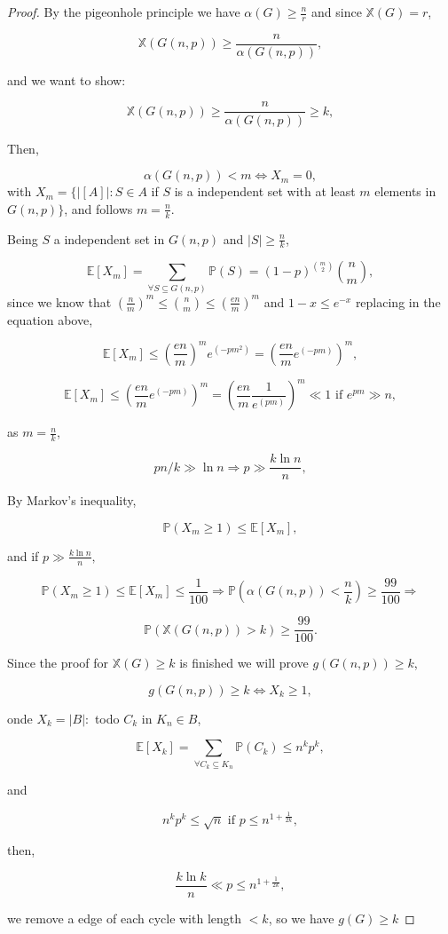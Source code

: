 \documentclass[12pt,twoside,a4paper]{book}
\numberwithin{equation}{section}
\let\subset\subseteq
\let\log=\ln
\theoremstyle{remark}
\begin{document}
\begin{proof}
By the pigeonhole principle we have $\alpha (G) \geq \frac{n}{r}$ and since $\mathbb{X}(G)=r$,

$$\mathbb{X}(G(n,p)) \geq \frac{n}{\alpha(G(n,p))},$$

and we want to show:

$$\mathbb{X}(G(n,p)) \geq \frac{n}{\alpha(G(n,p))} \geq k ,$$

Then,

$$\alpha(G(n,p)) < m \iff X_m=0 ,$$
with $X_m = \{|[A]|: S \in A$ if $S$ is a independent set with at least $m$ elements in $G(n,p)\}$,
and follows $m = \frac{n}{k}$. 

Being $S$ a independent set in $G(n,p)$ and $|S| \geq \frac{n}{k}$,

$$\mathbb{E}[X_m]=\sum_{\forall S\subset G(n,p)} \mathbb{P}(S) =(1-p)^{\binom{m}{2}} \binom{n}{m},$$
since we know that $\left(\frac{n}{m}\right)^m \leq \binom{n}{m} \leq \left(\frac{en}{m}\right)^m$ and $1-x \leq e^{-x}$ replacing in the equation above,

$$\mathbb{E}[X_m] \leq \left(\frac{en}{m}\right)^m  e^{(-pm^2)} = \left(\frac{en}{m} e^{(-pm)}\right)^m,$$

$$\mathbb{E}[X_m] \leq \left(\frac{en}{m} e^{(-pm)}\right)^m = \left(\frac{en}{m}\frac{1}{e^{(pm)}}\right)^m  \ll 1 \text{ if } e^{pm} \gg n ,$$ 

as $m =\frac{n}{k}$,

$$ pn/k \gg \log n \Rightarrow p \gg \frac{k\log n}{n},$$
 
 By Markov's inequality,
 
 $$ \mathbb{P}(X_m \geq 1) \leq \mathbb{E}[X_m] ,$$
 
and if $p \gg \frac{k \log n}{n},$
 
 $$ \mathbb{P}(X_m \geq 1) \leq \mathbb{E}[X_m] \leq \frac{1}{100}  \Rightarrow \mathbb{P}(\alpha (G(n,p)) < \frac{n}{k}) \geq \frac{99}{100} \Rightarrow $$

$$\mathbb{P}(\mathbb{X}(G(n,p)) > k) \geq \frac{99}{100}.$$


Since the proof for $\mathbb{X}(G) \geq k$ is finished we will prove $g(G(n,p))\geq k$,

$$ g(G(n,p)) \geq k \iff X_k \geq 1,$$


onde $X_k = |B|: $ todo $ C_k$ in $K_n \in B$,

$$\mathbb{E}[X_k] = \sum_{\forall C_k \subset K_n} \mathbb{P}(C_k) \leq n^kp^k,$$

and

$$n^kp^k \leq \sqrt{n} \text{ if } p \leq n^{1 + \frac{1}{2k}},$$

then,

$$\frac{k\log k}{n} \ll p \leq n^{1 + \frac{1}{2k}},$$

we remove a edge of each cycle with length $<k$, so we have $g(G) \geq k$

\end{proof}
\end{document}
